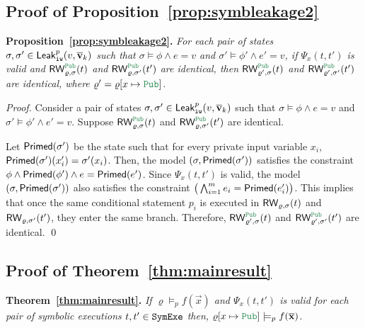 \subsection{Proof of Proposition~\ref{prop:symbleakage2}}
{\bf Proposition~\ref{prop:symbleakage2}.}
\textit{For each pair of
states $\sigma,\sigma'\in{\sf Leak}_{\tt iw}^p(v,\overline{\bf{v}}_k)$ such that
$\sigma\models \phi\wedge e=v$ and $\sigma'\models \phi'\wedge e'=v$,
if $\Psi_x(t,t')$ is valid and $\RW_{\varrho,\sigma}^{\Pub}(t)$ and $\RW_{\varrho,\sigma'}^{\Pub}(t')$ are identical,
then $\RW_{\varrho',\sigma}^{\Pub}(t)$ and $\RW_{\varrho',\sigma'}^{\Pub}(t')$ are identical,
where $\varrho'=\varrho[x\mapsto \Pub]$.}


\begin{proof}
Consider a pair of 
states $\sigma,\sigma'\in{\sf Leak}_{\tt iw}^p(v,\overline{\bf{v}}_k)$ such that
$\sigma\models \phi\wedge e=v$ and $\sigma'\models \phi'\wedge e'=v$.
Suppose $\RW_{\varrho,\sigma}^{\Pub}(t)$ and $\RW_{\varrho,\sigma'}^{\Pub}(t')$ are identical.


Let ${\sf Primed}(\sigma')$ be the state such that for every private input variable $x_i$,
${\sf Primed}(\sigma')(x_i')=\sigma'(x_i)$.
Then, the model $(\sigma,{\sf Primed}(\sigma'))$ satisfies the constraint $\phi\wedge {\sf Primed}(\phi')\wedge e={\sf Primed}(e')$.
Since $\Psi_x(t,t')$ is valid, the model $(\sigma,{\sf Primed}(\sigma'))$ also satisfies the constraint $\big(\bigwedge_{i=1}^m e_i={\sf Primed}(e_i')\big)$.
This implies that once the same conditional statement $p_i$ is executed in ${\sf RW}_{\varrho,\sigma}(t)$ and ${\sf RW}_{\varrho,\sigma'}(t')$, they enter the same branch.
Therefore, $\RW_{\varrho',\sigma}^{\Pub}(t)$ and $\RW_{\varrho',\sigma'}^{\Pub}(t')$ are identical.
\qed
\end{proof}

\subsection{Proof of Theorem~\ref{thm:mainresult}}
{\bf Theorem~\ref{thm:mainresult}.}
\textit{If $\varrho\models_p f(\vec{x})$ and $\Psi_x(t,t')$ is valid for each pair of symbolic executions $t,t'\in{\tt SymExe}$ %
then, $\varrho[x\mapsto \Pub]\models_p f(\vec{x})$.}


